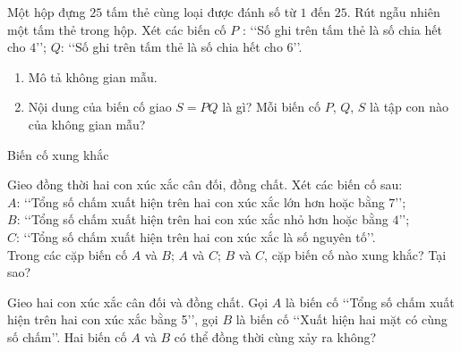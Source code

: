 \begin{vd}%
	Một hộp đựng $25$ tấm thẻ cùng loại được đánh số từ $1$ đến $25$. Rút ngẫu nhiên một tấm thẻ trong hộp. Xét các biến cố $P$ : \lq\lq Số ghi trên tấm thẻ là số chia hết cho $4$\rq\rq; $Q$: \lq\lq Số ghi trên tấm thẻ là số chia hết cho $6$\rq\rq.
	\begin{enumerate}
	\item Mô tả không gian mẫu.
	\item Nội dung của biến cố giao $S=P Q$ là gì? Mỗi biến cố $P$, $Q$, $S$ là tập con nào của không gian mẫu?
	\end{enumerate} 
\end{vd}
\begin{dang}{Biến cố xung khắc}
\end{dang}
\begin{vd}%
	Gieo đồng thời hai con xúc xắc cân đối, đồng chất. Xét các biến cố sau:\\
	$A$: \lq\lq Tổng số chấm xuất hiện trên hai con xúc xắc lớn hơn hoặc bằng $7$\rq\rq;\\
	$B$: \lq\lq Tổng số chấm xuất hiện trên hai con xúc xắc nhỏ hơn hoặc bằng $4$\rq\rq;\\
	$C$: \lq\lq Tổng số chấm xuất hiện trên hai con xúc xắc là số nguyên tố\rq\rq.\\
	Trong các cặp biến cố $A$ và $B; \, A$ và $C; \, B$ và $C$, cặp biến cố nào xung khắc? Tại sao?
\end{vd}
\begin{vd}
	Gieo hai con xúc xắc cân đối và đồng chất. Gọi $A$ là biến cố \lq\lq Tổng số chấm xuất hiện trên hai con xúc xắc bằng 5\rq\rq, gọi $B$ là biến cố \lq\lq Xuất hiện hai mặt có cùng số chấm\rq\rq. Hai biến cố $A$ và $B$ có thể đồng thời cùng xảy ra không?
\end{vd}
